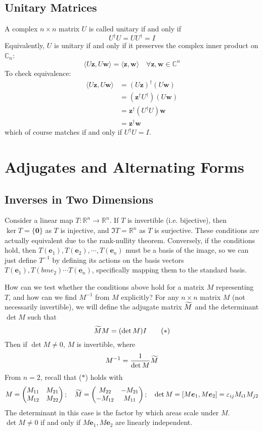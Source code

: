 \documentclass{article}
\begin{document}
	\subsection{Unitary Matrices}
	A complex $n \times n$ matrix $U$ is called unitary if and only if
	\[ U^\dagger U = U U^\dagger = I \]
	Equivalently, $U$ is unitary if and only if it preserves the complex inner product on $\mathbb C_n$:
	\[ \langle U \bm z, U \bm w \rangle = \langle \bm z, \bm w \rangle\quad \forall \bm z, \bm w \in \mathbb C^n \]
	To check equivalence:
	\begin{align*}
		\langle U \bm z, U \bm w \rangle &= (U \bm z)^\dagger (U \bm w) \\
		&= (\bm z^\dagger U^\dagger) (U \bm w) \\
		&= \bm z^\dagger (U^\dagger U) \bm w \\
		&= \bm z^\dagger \bm w
	\end{align*}
	which of course matches if and only if $U^\dagger U = I$.

	\section{Adjugates and Alternating Forms}
	\subsection{Inverses in Two Dimensions}
	Consider a linear map $T\colon \mathbb R^n \to \mathbb R^n$. If $T$ is invertible (i.e. bijective), then $\ker T = \{ \bm 0 \}$ as $T$ is injective, and $\Im T = \mathbb R^n$ as $T$ is surjective. These conditions are actually equivalent due to the rank-nullity theorem. Conversely, if the conditions hold, then $T(\bm e_1), T(\bm e_2), \cdots, T(\bm e_n)$ must be a basis of the image, so we can just define $T^{-1}$ by defining its actions on the basis vectors $T(\bm e_1), T(bm e_2) \cdots T(\bm e_n)$, specifically mapping them to the standard basis.

	How can we test whether the conditions above hold for a matrix $M$ representing $T$, and how can we find $M^{-1}$ from $M$ explicitly? For any $n \times n$ matrix $M$ (not necessarily invertible), we will define the adjugate matrix $\widetilde{M}$ and the determinant $\det M$ such that
	\[ \widetilde{M} M = (\det M) I \tag{$\ast$} \]
	Then if $\det M \neq 0$, $M$ is invertible, where
	\[ M^{-1} = \frac{1}{\det M}\widetilde{M} \]
	From $n=2$, recall that ($\ast$) holds with
	\[ M = \begin{pmatrix}
		M_{11} & M_{21} \\
		M_{12} & M_{22}
	\end{pmatrix};\quad \widetilde{M} = \begin{pmatrix}
		M_{22} & -M_{21} \\
		-M_{12} & M_{11}
	\end{pmatrix};\quad \det M = [M\bm e_1, M\bm e_2] = \varepsilon_{ij}M_{i1}M_{j2} \]
	The determinant in this case is the factor by which areas scale under $M$. $\det M \neq 0$ if and only if $M\bm e_1, M\bm e_2$ are linearly independent.
\end{document}
